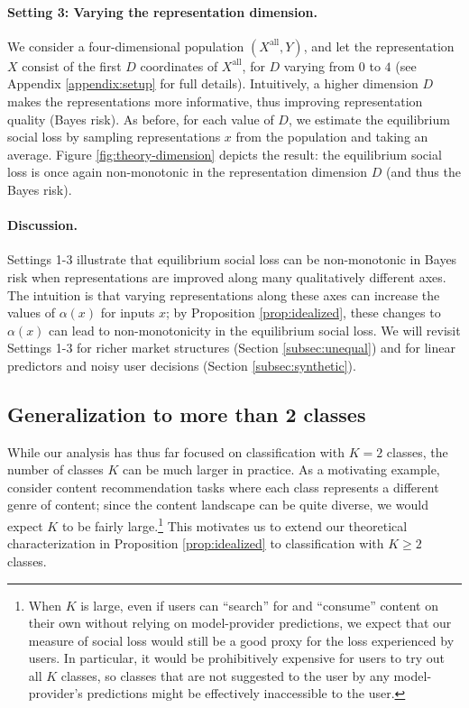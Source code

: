 \documentclass[letterpaper,11pt]{article}
\theoremstyle{plain}
\begin{document}
\paragraph{Setting 3: Varying the representation dimension.} We consider a four-dimensional population $(X^{\text{all}}, Y)$, and let the representation $X$ consist of the first $D$ coordinates of $X^{\text{all}}$, for $D$ varying from $0$ to $4$ (see Appendix \ref{appendix:setup} for full details). Intuitively, a higher dimension $D$ makes the representations more informative, thus improving representation quality (Bayes risk). As before, for each value of $D$, we estimate the equilibrium social loss by sampling representations $x$ from the population and taking an average. Figure \ref{fig:theory-dimension} depicts the result: the equilibrium social loss is once again non-monotonic in the representation dimension $D$ (and thus the Bayes risk). 

\paragraph{Discussion.} 
Settings 1-3 illustrate that equilibrium social loss can be non-monotonic in Bayes risk when representations are improved along many qualitatively different axes. The intuition is that varying representations along these axes can increase the values of $\alpha(x)$ for inputs $x$; by Proposition \ref{prop:idealized}, these changes to $\alpha(x)$ can lead to non-monotonicity in the equilibrium social loss. We will revisit Settings 1-3 for richer market structures (Section \ref{subsec:unequal}) and for linear predictors and noisy user decisions (Section \ref{subsec:synthetic}). 

\subsection{Generalization to more than 2 classes}\label{subsec:idealizedmulticlass}




While our analysis has thus far focused on classification with $K = 2$ classes, the number of classes $K$ can be much larger in practice. As a motivating example, consider content recommendation tasks where each class represents a different genre of content; since the content landscape can be quite diverse, we would expect $K$ to be fairly large.\footnote{When $K$ is large, even if users can ``search'' for and ``consume'' content on their own without relying on model-provider predictions, we expect that our measure of social loss would still be a good proxy for the loss experienced by users. In particular, it would be prohibitively expensive for users to try out all $K$ classes, so classes that are not suggested to the user by any model-provider's predictions might be effectively inaccessible to the user.} This motivates us to extend our theoretical characterization in Proposition \ref{prop:idealized} to classification with $K \ge 2$ classes.
\end{document}

